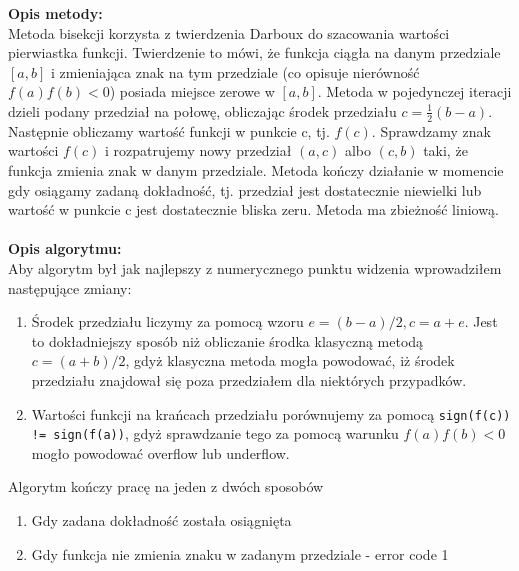 \documentclass[12pt]{article}
\begin{document}
\noindent \textbf{Opis metody:}\\
Metoda bisekcji korzysta z twierdzenia Darboux do szacowania wartości pierwiastka funkcji. Twierdzenie to mówi, że funkcja ciągła na danym przedziale $[a, b]$ i zmieniająca znak na tym przedziale (co opisuje nierówność $f(a)f(b) < 0$) posiada miejsce zerowe w $[a,b]$. Metoda w pojedynczej iteracji dzieli podany przedział na połowę, obliczając środek przedziału $c=\frac{1}{2}(b-a)$. Następnie obliczamy wartość funkcji w punkcie c, tj. $f(c)$. Sprawdzamy znak wartości $f(c)$ i rozpatrujemy nowy przedział $(a, c)$ albo $(c, b)$ taki, że funkcja zmienia znak w danym przedziale. Metoda kończy działanie w momencie gdy osiągamy zadaną dokładność, tj. przedział jest dostatecznie niewielki lub wartość w punkcie c jest dostatecznie bliska zeru. Metoda ma zbieżność liniową.
\\
\\
\noindent \textbf{Opis algorytmu:}\\
Aby algorytm był jak najlepszy z numerycznego punktu widzenia wprowadziłem następujące zmiany:
\begin{enumerate}
	\item Środek przedziału liczymy za pomocą wzoru $e=(b-a)/2, c=a+e$. Jest to dokładniejszy sposób niż obliczanie środka klasyczną metodą $c=(a+b)/2$, gdyż klasyczna metoda mogła powodować, iż środek przedziału znajdował się poza przedziałem dla niektórych przypadków.
	\item Wartości funkcji na krańcach przedziału porównujemy za pomocą \texttt{sign(f(c)) != sign(f(a))}, gdyż sprawdzanie tego za pomocą warunku $f(a)f(b) < 0$ mogło powodować overflow lub underflow.
\end{enumerate}
Algorytm kończy pracę na jeden z dwóch sposobów
\begin{enumerate}
\item Gdy zadana dokładność została osiągnięta
\item Gdy funkcja nie zmienia znaku w zadanym przedziale - error code 1
\end{enumerate}
\end{document}
